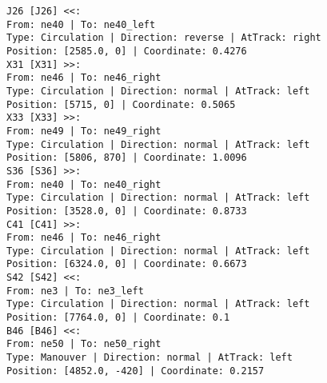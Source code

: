 \begin{lstlisting}[language = {}, caption = Signalling.RNA, label = {lst:EJ9_6}]
J26 [J26] <<:
From: ne40 | To: ne40_left
Type: Circulation | Direction: reverse | AtTrack: right 
Position: [2585.0, 0] | Coordinate: 0.4276
X31 [X31] >>:
From: ne46 | To: ne46_right
Type: Circulation | Direction: normal | AtTrack: left 
Position: [5715, 0] | Coordinate: 0.5065
X33 [X33] >>:
From: ne49 | To: ne49_right
Type: Circulation | Direction: normal | AtTrack: left 
Position: [5806, 870] | Coordinate: 1.0096
S36 [S36] >>:
From: ne40 | To: ne40_right
Type: Circulation | Direction: normal | AtTrack: left 
Position: [3528.0, 0] | Coordinate: 0.8733
C41 [C41] >>:
From: ne46 | To: ne46_right
Type: Circulation | Direction: normal | AtTrack: left 
Position: [6324.0, 0] | Coordinate: 0.6673
S42 [S42] <<:
From: ne3 | To: ne3_left
Type: Circulation | Direction: normal | AtTrack: left 
Position: [7764.0, 0] | Coordinate: 0.1
B46 [B46] <<:
From: ne50 | To: ne50_right
Type: Manouver | Direction: normal | AtTrack: left 
Position: [4852.0, -420] | Coordinate: 0.2157
	\end{lstlisting}	
	
